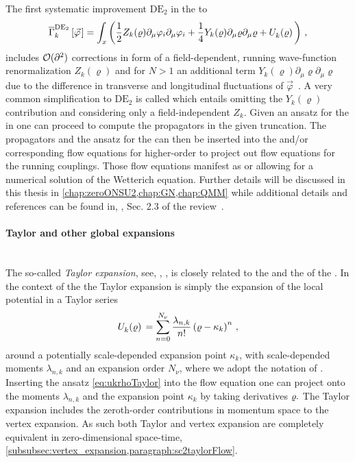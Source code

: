 The first systematic improvement $\mathrm{DE}_2$ in the \de{} to \lpa{}
\begin{align}
	\FSeaa_k^{\mathrm{DE}_2}\sbr{\vec{\varphi}\mkern2mu}=\int_x\del[3]{\frac{1}{2}Z_k(\varrho)\partial_\mu\varphi_i\partial_\mu\varphi_i+\frac{1}{4}Y_k(\varrho)\partial_\mu\varrho\partial_\mu\varrho+\Ukrho{}}\,,
	\label{eq:deDE2}
\end{align}
includes $\mathcal{O}(\partial^2)$ corrections in form of a field-dependent, running wave-function renormalization $Z_k(\varrho)$ and for $N>1$ an additional term $Y_k(\varrho)\partial_\mu\varrho\partial_\mu\varrho$ due to the difference in transverse and longitudinal fluctuations of $\vec{\varphi}$~\cite{Dupuis:2020fhh,Eser:2019pvd}. 
A very common simplification to $\mathrm{DE}_2$ is called \lpap{} which entails omitting the $Y_k(\varrho)$ contribution and considering only a field-independent $Z_k$.
Given an ansatz for the \eaa{} in \de{} one can proceed to compute the propagators in the given truncation.
The propagators and the ansatz for the \eaa{} can then be inserted into the \frgEquation{} and/or corresponding flow equations for higher-order \nptFunctions{} to project out flow equations for the running couplings.
Those flow equations manifest as \pdes{} or \odes{} allowing for a numerical solution of the Wetterich equation. 
Further details will be discussed in this thesis in \cref{chap:zeroONSU2,chap:GN,chap:QMM} while additional details and references can be found in, \eg{}, Sec. 2.3 of the review~\cite{Dupuis:2020fhh}.

\paragraph{\frg{} Taylor and other global expansions}\label{paragraph:taylorExpansion}\mbox{} \\
The so-called \textit{\frg{} Taylor expansion}, see, \eg{}, \ccite{\frgTaylorReferences}, is closely related to the  and the \lpa{} of the .
In the context of the \lpa{} the \frg{} Taylor expansion is simply the expansion of the \rgscaledependent{} local potential in a Taylor series
\begin{align}
	\Ukrho{}=\sum_{n=0}^{N_\nu} \frac{\lambda_{n,k}}{n!}\del{\MFrho-\kappa_k}^n\, ,\label{eq:ukrhoTaylor}
\end{align}
around a potentially scale-depended expansion point $\kappa_k$, with scale-depended moments $\lambda_{n,k}$ and an expansion order $N_\nu$, where we adopt the notation of .
Inserting the ansatz \nolinebreak[3]\eqref{eq:ukrhoTaylor} into the \lpa{} flow equation one can project onto the moments $\lambda_{n,k}$ and the expansion point $\kappa_k$ by taking derivatives \wrt{} $\varrho.$
The \frg{} Taylor expansion includes the zeroth-order contributions in momentum space to the vertex expansion.
As such both \frg{} Taylor and vertex expansion are completely equivalent in zero-dimensional space-time, \cf{} \cref{subsubsec:vertex_expansion,paragraph:sc2taylorFlow}.

